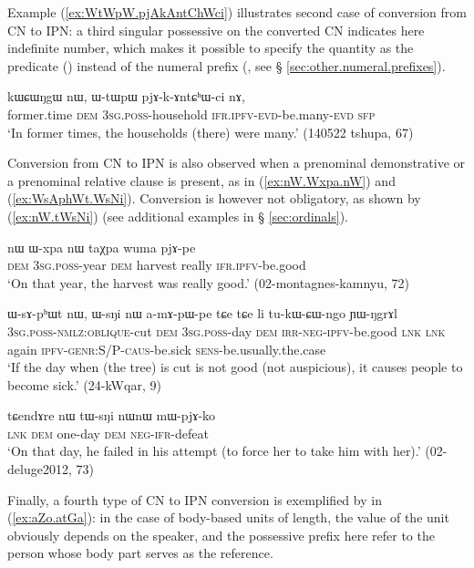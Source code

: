 Example (\ref{ex:WtWpW.pjAkAntChWci}) illustrates second case of conversion from CN to IPN: a third singular possessive on the converted CN indicates here indefinite number, which makes it possible to specify the quantity as the predicate () instead of the numeral prefix (, see § \ref{sec:other.numeral.prefixes}).

\begin{exe}
\ex \label{ex:WtWpW.pjAkAntChWci}
\gll kɯɕɯŋgɯ nɯ, ɯ-tɯpɯ pjɤ-k-ɤntɕʰɯ-ci nɤ, \\
 former.time \textsc{dem} \textsc{3sg}.\textsc{poss}-household \textsc{ifr}.\textsc{ipfv}-\textsc{evd}-be.many-\textsc{evd} \textsc{sfp} \\
\glt `In former times, the households (there) were many.' (140522 tshupa, 67)
\end{exe}

Conversion from CN to IPN is also observed when a prenominal demonstrative or a prenominal relative clause is present, as in (\ref{ex:nW.Wxpa.nW}) and (\ref{ex:WsAphWt.WsNi}). Conversion is however not obligatory, as shown by (\ref{ex:nW.tWsNi}) (see additional examples in § \ref{sec:ordinals}).

\begin{exe}
\ex \label{ex:nW.Wxpa.nW}
\gll nɯ ɯ-xpa nɯ taχpa wuma pjɤ-pe \\
\textsc{dem} \textsc{3sg}.\textsc{poss}-year \textsc{dem} harvest really \textsc{ifr}.\textsc{ipfv}-be.good \\
\glt `On that year, the harvest was really good.' (02-montagnes-kamnyu, 72)
\end{exe}

\begin{exe}
\ex \label{ex:WsAphWt.WsNi}
\gll ɯ-sɤ-pʰɯt nɯ, ɯ-sŋi nɯ a-mɤ-pɯ-pe tɕe tɕe li tu-kɯ-ɕɯ-ngo ɲɯ-ŋgrɤl \\
\textsc{3sg}.\textsc{poss}-\textsc{nmlz}:\textsc{oblique}-cut \textsc{dem} \textsc{3sg}.\textsc{poss}-day \textsc{dem} \textsc{irr}-\textsc{neg}-\textsc{ipfv}-be.good \textsc{lnk} \textsc{lnk} again \textsc{ipfv}-\textsc{genr}:S/P-\textsc{caus}-be.sick \textsc{sens}-be.usually.the.case \\
\glt `If the day when (the tree) is cut is not good (not auspicious), it causes people to become sick.' (24-kWqar, 9)
\end{exe}

\begin{exe}
\ex \label{ex:nW.tWsNi}
\gll tɕendɤre nɯ tɯ-sŋi nɯnɯ mɯ-pjɤ-ko \\
\textsc{lnk} \textsc{dem} one-day \textsc{dem} \textsc{neg}-\textsc{ifr}-defeat \\
\glt `On that day, he failed in his attempt (to force her to take him with her).' (02-deluge2012, 73)
\end{exe}
Finally, a fourth type of CN to IPN conversion is exemplified by  in (\ref{ex:aZo.atGa}): in the case of body-based units of length, the value of the unit obviously depends on the speaker, and the possessive prefix here refer to the person whose body part serves as the reference.

